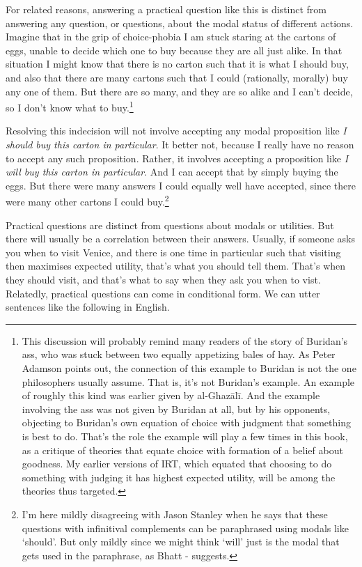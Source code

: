 \documentclass[
  11pt,
]{book}
\begin{document}
For related reasons, answering a practical question like this is distinct from answering any question, or questions, about the modal status of different actions. Imagine that in the grip of choice-phobia I am stuck staring at the cartons of eggs, unable to decide which one to buy because they are all just alike. In that situation I might know that there is no carton such that it is what I should buy, and also that there are many cartons such that I could (rationally, morally) buy any one of them. But there are so many, and they are so alike and I can't decide, so I don't know what to buy.\footnote{This discussion will probably remind many readers of the story of Buridan's ass, who was stuck between two equally appetizing bales of hay. As Peter Adamson \citeyearpar[453ff]{Adamson2019} points out, the connection of this example to Buridan is not the one philosophers usually assume. That is, it's not Buridan's example. An example of roughly this kind was earlier given by al-Ghazālī. And the example involving the ass was not given by Buridan at all, but by his opponents, objecting to Buridan's own equation of choice with judgment that something is best to do. That's the role the example will play a few times in this book, as a critique of theories that equate choice with formation of a belief about goodness. My earlier versions of IRT, which equated that choosing to do something with judging it has highest expected utility, will be among the theories thus targeted.}

Resolving this indecision will not involve accepting any modal proposition like \emph{I should buy this carton in particular}. It better not, because I really have no reason to accept any such proposition. Rather, it involves accepting a proposition like \emph{I will buy this carton in particular}. And I can accept that by simply buying the eggs. But there were many answers I could equally well have accepted, since there were many other cartons I could buy.\footnote{I'm here mildly disagreeing with Jason Stanley \citeyearpar[Ch. 5]{Stanley2011} when he says that these questions with infinitival complements can be paraphrased using modals like `should'. But only mildly since we might think `will' just is the modal that gets used in the paraphrase, as Bhatt -\citet{Bhatt1999} suggests.}

Practical questions are distinct from questions about modals or utilities. But there will usually be a correlation between their answers. Usually, if someone asks you when to visit Venice, and there is one time in particular such that visiting then maximises expected utility, that's what you should tell them. That's when they should visit, and that's what to say when they ask you when to vist. Relatedly, practical questions can come in conditional form. We can utter sentences like the following in English.
\end{document}
